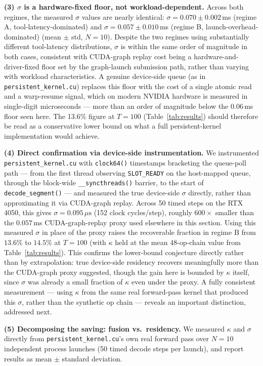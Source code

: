 \documentclass{article}
\begin{document}
\textbf{(3) $\sigma$ is a hardware-fixed floor, not workload-dependent.}
Across both regimes, the measured $\sigma$ values are nearly identical:
$\sigma = 0.070\pm0.002$\,ms (regime A, tool-latency-dominated) and
$\sigma = 0.057\pm0.010$\,ms (regime B, launch-overhead-dominated)
(mean $\pm$ std, $N=10$). Despite
the two regimes using substantially different tool-latency distributions,
$\sigma$ is within the same order of magnitude in both cases, consistent with
CUDA-graph
replay cost being a hardware-and-driver-fixed floor set by the
graph-launch submission path, rather than varying with workload
characteristics. A genuine device-side queue (as in
\texttt{persistent\_kernel.cu}) replaces this floor with the cost of a
single atomic read and a warp-resume signal, which on modern NVIDIA
hardware is measured in single-digit microseconds --- more than an
order of magnitude below the 0.06\,ms floor seen here. The 13.6\%
figure at $T=100$ (Table~\ref{tab:results}) should therefore be read as a conservative lower
bound on what a full persistent-kernel implementation would achieve.

\textbf{(4) Direct confirmation via device-side instrumentation.}
We instrumented \texttt{persistent\_kernel.cu} with \texttt{clock64()}
timestamps bracketing the queue-poll path --- from the first thread
observing \texttt{SLOT\_READY} on the host-mapped queue, through the
block-wide \texttt{\_\_syncthreads()} barrier, to the start of
\texttt{decode\_segment()} --- and measured the true device-side
$\sigma$ directly, rather than approximating it via CUDA-graph replay.
Across 50 timed steps on the RTX 4050, this gives
$\sigma = 0.095\,\mu\text{s}$ (152 clock cycles/step), roughly
$600\times$ smaller than the $0.057$\,ms CUDA-graph-replay proxy
used elsewhere in this section. Using this measured $\sigma$ in place
of the proxy raises the recoverable fraction in regime B from
$13.6\%$ to $\mathbf{14.5\%}$ at $T=100$ (with $\kappa$ held at the
mean 48-op-chain value from Table~\ref{tab:results}). This
confirms the lower-bound conjecture directly rather than by
extrapolation: true device-side residency recovers meaningfully more
than the CUDA-graph proxy suggested, though the gain here is bounded
by $\kappa$ itself, since $\sigma$ was already a small fraction of
$\kappa$ even under the proxy. A fully consistent measurement --- using
$\kappa$ from the same real forward-pass kernel that produced this
$\sigma$, rather than the synthetic op chain --- reveals an important
distinction, addressed next.

\textbf{(5) Decomposing the saving: fusion vs.\ residency.} We
measured $\kappa$ and $\sigma$ directly from
\texttt{persistent\_kernel.cu}'s own real forward pass over $N=10$
independent process launches (50 timed decode steps per launch), and
report results as mean $\pm$ standard deviation.
\end{document}
